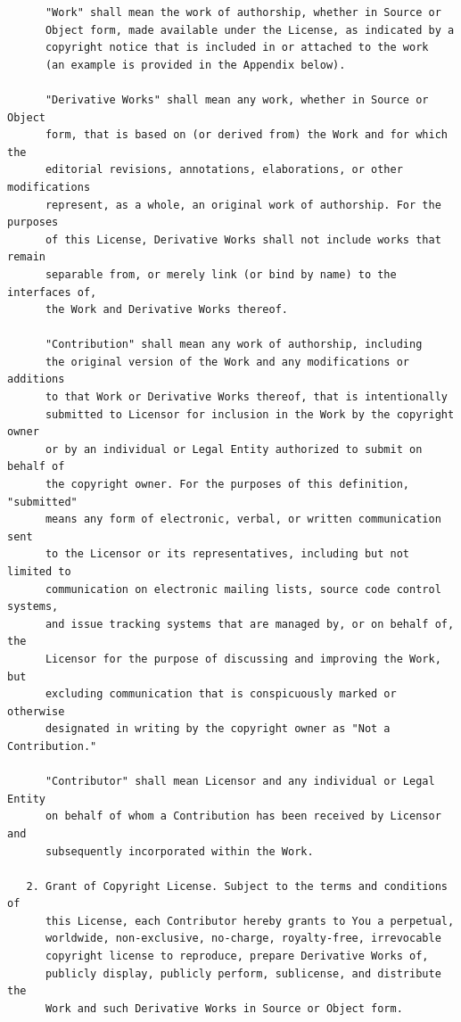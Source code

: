 \begin{verbatim}
      "Work" shall mean the work of authorship, whether in Source or
      Object form, made available under the License, as indicated by a
      copyright notice that is included in or attached to the work
      (an example is provided in the Appendix below).

      "Derivative Works" shall mean any work, whether in Source or Object
      form, that is based on (or derived from) the Work and for which the
      editorial revisions, annotations, elaborations, or other modifications
      represent, as a whole, an original work of authorship. For the purposes
      of this License, Derivative Works shall not include works that remain
      separable from, or merely link (or bind by name) to the interfaces of,
      the Work and Derivative Works thereof.

      "Contribution" shall mean any work of authorship, including
      the original version of the Work and any modifications or additions
      to that Work or Derivative Works thereof, that is intentionally
      submitted to Licensor for inclusion in the Work by the copyright owner
      or by an individual or Legal Entity authorized to submit on behalf of
      the copyright owner. For the purposes of this definition, "submitted"
      means any form of electronic, verbal, or written communication sent
      to the Licensor or its representatives, including but not limited to
      communication on electronic mailing lists, source code control systems,
      and issue tracking systems that are managed by, or on behalf of, the
      Licensor for the purpose of discussing and improving the Work, but
      excluding communication that is conspicuously marked or otherwise
      designated in writing by the copyright owner as "Not a Contribution."

      "Contributor" shall mean Licensor and any individual or Legal Entity
      on behalf of whom a Contribution has been received by Licensor and
      subsequently incorporated within the Work.

   2. Grant of Copyright License. Subject to the terms and conditions of
      this License, each Contributor hereby grants to You a perpetual,
      worldwide, non-exclusive, no-charge, royalty-free, irrevocable
      copyright license to reproduce, prepare Derivative Works of,
      publicly display, publicly perform, sublicense, and distribute the
      Work and such Derivative Works in Source or Object form.


\end{verbatim}
